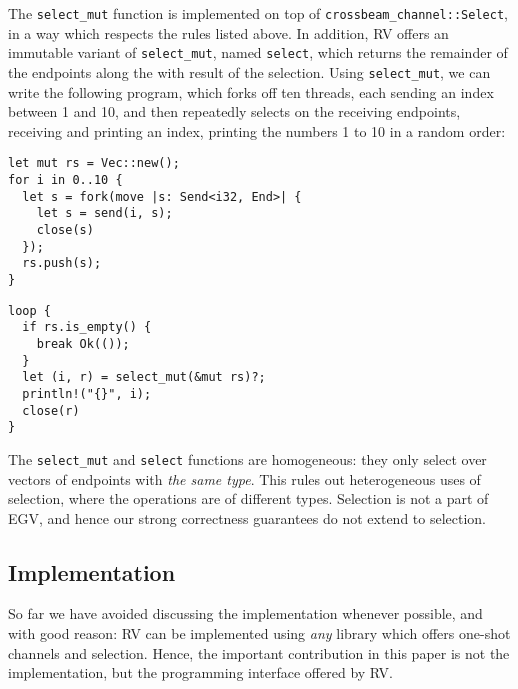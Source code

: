 \documentclass[copyright,creativecommons]{eptcs}
\begin{document}
The \lstinline{select_mut} function is implemented on top of \lstinline{crossbeam_channel::Select}, in a way which respects the rules listed above. In addition, RV offers an immutable variant of \lstinline{select_mut}, named \lstinline{select}, which returns the remainder of the endpoints along the with result of the selection. Using \lstinline{select_mut}, we can write the following program, which forks off ten threads, each sending an index between 1 and 10, and then repeatedly selects on the receiving endpoints, receiving and printing an index, printing the numbers 1 to 10 in a random order:

\vspace{-0.5\baselineskip}
\begin{minipage}[t]{0.5\linewidth}
\begin{lstlisting}
let mut rs = Vec::new();
for i in 0..10 {
  let s = fork(move |s: Send<i32, End>| {
    let s = send(i, s);
    close(s)
  });
  rs.push(s);
}
\end{lstlisting}
\end{minipage}
\begin{minipage}[t]{0.5\linewidth}
\begin{lstlisting}
loop {
  if rs.is_empty() {
    break Ok(());
  }
  let (i, r) = select_mut(&mut rs)?;
  println!("{}", i);
  close(r)
}
\end{lstlisting}
\end{minipage}

The \lstinline{select_mut} and \lstinline{select} functions are homogeneous: they only select over vectors of endpoints with \emph{the same type}. This rules out heterogeneous uses of selection, where the operations are of different types. Selection is not a part of EGV, and hence our strong correctness guarantees do not extend to selection.

\subsection{Implementation}\label{sec:implementation}
So far we have avoided discussing the implementation whenever possible, and with good reason: RV can be implemented using \emph{any} library which offers one-shot channels and selection. Hence, the important contribution in this paper is not the implementation, but the programming interface offered by RV. 
\end{document}
